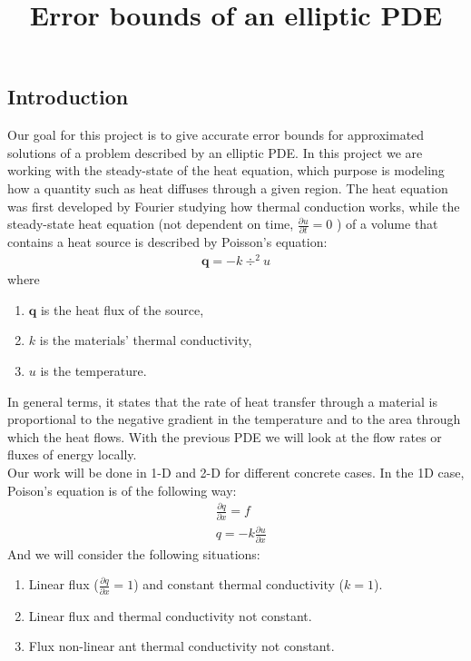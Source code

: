 \documentclass{article}
\title{Error bounds of an elliptic PDE}
\date{}
\begin{document}
    \maketitle
    \subsection*{Introduction}
    Our goal for this project is to give accurate error bounds for approximated solutions of a problem described by an elliptic PDE. In this project we are working with the steady-state of the heat equation, which purpose is modeling how a quantity such as heat diffuses through a given region. The heat equation was first developed by Fourier studying how thermal conduction works, while the steady-state heat equation (not dependent on time, $\frac{\partial u}{\partial t} = 0$ ) of a volume that contains a heat source is described by Poisson's equation:
    \begin{align*}
        \bm{q} = -k \div ^2 u
    \end{align*}
    where 
    \begin{enumerate}
        \item[] $\bm{q}$ is the heat flux of the source,
        \item[] $k$ is the materials' thermal conductivity,
        \item[] $u$ is the temperature.
    \end{enumerate}

    In general terms, it states that the rate of heat transfer through a material is proportional to the negative gradient in the temperature and to the area through which the heat flows. With the previous PDE we will look at the flow rates or fluxes of energy locally. \\
    Our work will be done in 1-D and 2-D for different concrete cases. In the 1D case, Poison's equation is of the following way:
    \begin{align*}
        &\frac{\partial q}{\partial x} = f \\
        &q = -k \frac{\partial u}{\partial x} 
    \end{align*}
    And we will consider the following situations:
    \begin{enumerate}
        \item Linear flux ($\frac{\partial q}{\partial x} = 1$) and constant thermal conductivity ($k=1$).
        \item Linear flux and thermal conductivity not constant.
        \item Flux non-linear ant thermal conductivity not constant.
    \end{enumerate}
\end{document}
